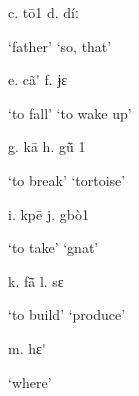 \begin{styleindexi}
            c.  tō1                                              d.  díː
\end{styleindexi}

\begin{styleindexi}
                ‘father’                                            ‘so, that’
\end{styleindexi}

\begin{styleindexi}
            e.  cã\'{}                                                  f.   ɉɛ  
\end{styleindexi}

\begin{styleindexi}
                ‘to fall’                                            ‘to wake up’  
\end{styleindexi}

\begin{styleindexi}
            g.  kā                                                 h.  gũ\={} 1  
\end{styleindexi}

\begin{styleindexi}
                ‘to break’                                          ‘tortoise’
\end{styleindexi}

\begin{styleindexi}
            i.   kpē                                              j.   gbò1       
\end{styleindexi}

\begin{styleindexi}
                   ‘to take’                                           ‘gnat’
\end{styleindexi}

\begin{styleindexi}
            k.   fã\={}                                                  l.   sɛ
\end{styleindexi}

\begin{styleindexi}
                ‘to build’                                           ‘produce’
\end{styleindexi}

\begin{styleindexi}
            m.  hɛ\'{} 
\end{styleindexi}

\begin{styleindexi}
                ‘where’                                    
\end{styleindexi}

